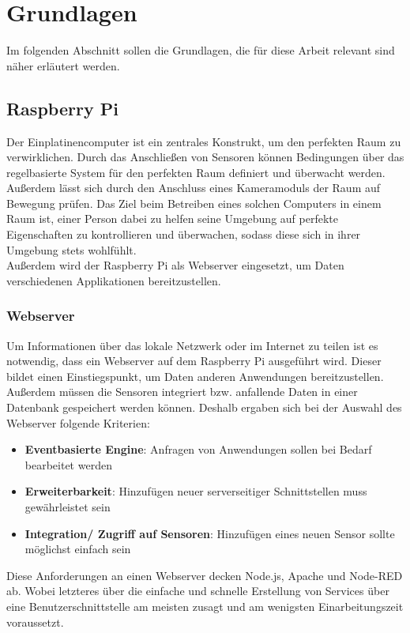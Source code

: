 \chapter{Grundlagen}
Im folgenden Abschnitt sollen die Grundlagen, die für diese Arbeit relevant sind näher erläutert werden.

\section{Raspberry Pi} 
Der Einplatinencomputer ist ein zentrales Konstrukt, um den perfekten Raum zu verwirklichen. Durch das Anschließen von Sensoren können Bedingungen über das regelbasierte System für den perfekten Raum definiert und überwacht werden. Außerdem lässt sich durch den Anschluss eines Kameramoduls der Raum auf Bewegung prüfen. Das Ziel beim Betreiben eines solchen Computers in einem Raum ist, einer Person dabei zu helfen seine Umgebung auf perfekte Eigenschaften zu kontrollieren und überwachen, sodass diese sich in ihrer Umgebung stets wohlfühlt. 
\\Außerdem wird der Raspberry Pi als Webserver eingesetzt, um Daten verschiedenen Applikationen bereitzustellen. 

\subsection{Webserver}
Um Informationen über das lokale Netzwerk oder im Internet zu teilen ist es notwendig, dass ein Webserver auf dem Raspberry Pi ausgeführt wird\cite{t3n:t3n}. Dieser bildet einen Einstiegspunkt, um Daten anderen Anwendungen bereitzustellen. Außerdem müssen die Sensoren integriert bzw. anfallende Daten in einer Datenbank gespeichert werden können. Deshalb ergaben sich bei der Auswahl des Webserver folgende Kriterien:
\begin{itemize}
	\item \textbf{Eventbasierte Engine}: Anfragen von Anwendungen sollen bei Bedarf bearbeitet werden
	\item \textbf{Erweiterbarkeit}: Hinzufügen neuer serverseitiger Schnittstellen muss gewährleistet sein
	\item \textbf{Integration/ Zugriff auf Sensoren}: Hinzufügen eines neuen Sensor sollte möglichst einfach sein
\end{itemize} 
Diese Anforderungen an einen Webserver decken Node.js, Apache und Node-RED ab. Wobei letzteres über die einfache und schnelle Erstellung von Services über eine Benutzerschnittstelle am meisten zusagt und am wenigsten Einarbeitungszeit voraussetzt.

